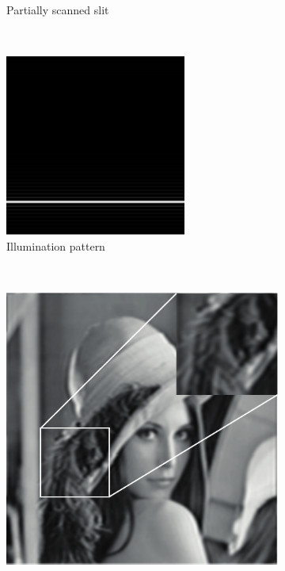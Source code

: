 \begin{figure}[h]
\begin{subfigure}[t]{0.23\textwidth}
      \caption{Partially scanned slit}
  \end{subfigure}~
  \begin{subfigure}[t]{0.23\textwidth}
      \centering
      \includegraphics[width=\textwidth]{widefield_slit/illiumination_partial}
      \caption{Illumination pattern}
  \end{subfigure}\\
  \begin{subfigure}[t]{0.23\textwidth}
      \centering
      \includegraphics[width=\textwidth]{widefield_slit/slitscanned}

\end{subfigure}
\end{figure}
